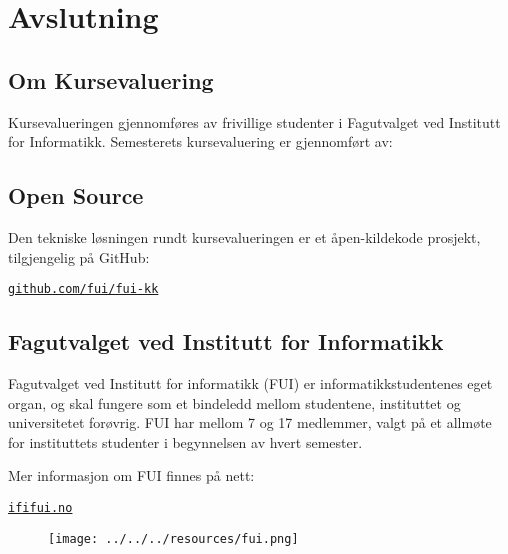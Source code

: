 \chapter{Avslutning}
\newpage

\section{Om Kursevaluering}
Kursevalueringen gjennomføres av frivillige studenter i Fagutvalget ved Institutt for Informatikk.
Semesterets kursevaluering er gjennomført av:\\


\section{Open Source}
Den tekniske løsningen rundt kursevalueringen er et åpen-kildekode prosjekt, tilgjengelig på GitHub:
\begin{center}
\href{https://github.com/fui/fui-kk}{\texttt{github.com/fui/fui-kk}}
\end{center}

\section{Fagutvalget ved Institutt for Informatikk}
Fagutvalget ved Institutt for informatikk (FUI) er informatikkstudentenes eget organ, og skal
fungere som et bindeledd mellom studentene, instituttet og universitetet forøvrig. FUI har mellom 7 og 17 medlemmer, valgt på et allmøte for instituttets studenter i begynnelsen av hvert semester.

Mer informasjon om FUI finnes på nett:
\begin{center}
\href{http://ififui.no/}{\texttt{ififui.no}}
\end{center}

\begin{figure}[H]
\begin{center}
\texttt{[image: ../../../resources/fui.png]}
\end{center}
\end{figure}


